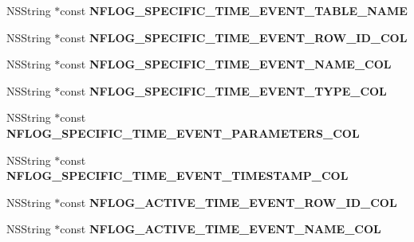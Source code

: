 \begin{DoxyCompactItemize}
N\+S\+String $\ast$const {\bfseries N\+F\+L\+O\+G\+\_\+\+S\+P\+E\+C\+I\+F\+I\+C\+\_\+\+T\+I\+M\+E\+\_\+\+E\+V\+E\+N\+T\+\_\+\+T\+A\+B\+L\+E\+\_\+\+N\+A\+ME}
\item 
\mbox{\label{interface_n_f_l_o_g_constants_a239eeb56ad4384d5ff7824bd48c5c686}} 
N\+S\+String $\ast$const {\bfseries N\+F\+L\+O\+G\+\_\+\+S\+P\+E\+C\+I\+F\+I\+C\+\_\+\+T\+I\+M\+E\+\_\+\+E\+V\+E\+N\+T\+\_\+\+R\+O\+W\+\_\+\+I\+D\+\_\+\+C\+OL}
\item 
\mbox{\label{interface_n_f_l_o_g_constants_a9132874c6ac06c25316da1d97956d7c8}} 
N\+S\+String $\ast$const {\bfseries N\+F\+L\+O\+G\+\_\+\+S\+P\+E\+C\+I\+F\+I\+C\+\_\+\+T\+I\+M\+E\+\_\+\+E\+V\+E\+N\+T\+\_\+\+N\+A\+M\+E\+\_\+\+C\+OL}
\item 
\mbox{\label{interface_n_f_l_o_g_constants_ac340a68e0bc0b45b9bd73e2c7632808b}} 
N\+S\+String $\ast$const {\bfseries N\+F\+L\+O\+G\+\_\+\+S\+P\+E\+C\+I\+F\+I\+C\+\_\+\+T\+I\+M\+E\+\_\+\+E\+V\+E\+N\+T\+\_\+\+T\+Y\+P\+E\+\_\+\+C\+OL}
\item 
\mbox{\label{interface_n_f_l_o_g_constants_a1bbc3c9343bb6797c04d6d30adf91152}} 
N\+S\+String $\ast$const {\bfseries N\+F\+L\+O\+G\+\_\+\+S\+P\+E\+C\+I\+F\+I\+C\+\_\+\+T\+I\+M\+E\+\_\+\+E\+V\+E\+N\+T\+\_\+\+P\+A\+R\+A\+M\+E\+T\+E\+R\+S\+\_\+\+C\+OL}
\item 
\mbox{\label{interface_n_f_l_o_g_constants_a6f6699563fb37968f2f182307e483df3}} 
N\+S\+String $\ast$const {\bfseries N\+F\+L\+O\+G\+\_\+\+S\+P\+E\+C\+I\+F\+I\+C\+\_\+\+T\+I\+M\+E\+\_\+\+E\+V\+E\+N\+T\+\_\+\+T\+I\+M\+E\+S\+T\+A\+M\+P\+\_\+\+C\+OL}
\item 
\mbox{\label{interface_n_f_l_o_g_constants_a17f7a900e61a9e2e66945f788f2d3830}} 
N\+S\+String $\ast$const {\bfseries N\+F\+L\+O\+G\+\_\+\+A\+C\+T\+I\+V\+E\+\_\+\+T\+I\+M\+E\+\_\+\+E\+V\+E\+N\+T\+\_\+\+R\+O\+W\+\_\+\+I\+D\+\_\+\+C\+OL}
\item 
\mbox{\label{interface_n_f_l_o_g_constants_a503e6530beabc4dc0eeb8bd3eecf6cb9}} 
N\+S\+String $\ast$const {\bfseries N\+F\+L\+O\+G\+\_\+\+A\+C\+T\+I\+V\+E\+\_\+\+T\+I\+M\+E\+\_\+\+E\+V\+E\+N\+T\+\_\+\+N\+A\+M\+E\+\_\+\+C\+OL}

\end{DoxyCompactItemize}
